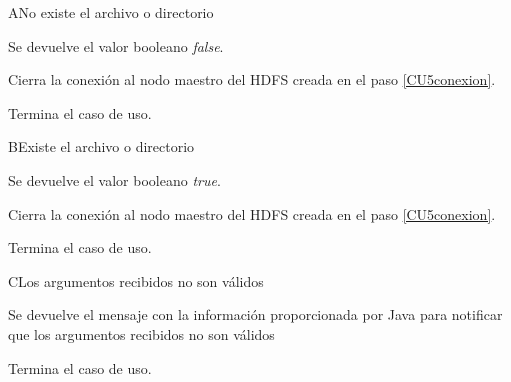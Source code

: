 
\begin{UCtrayectoriaA}{A}{No existe el archivo o directorio}

	\UCpaso[\UCsist]  Se devuelve el valor booleano \emph{false}.

	\UCpaso[\UCsist] Cierra la conexión al nodo maestro del HDFS creada en el paso \ref{CU5conexion}.

	\UCpaso[] Termina el caso de uso.

\end{UCtrayectoriaA}



\begin{UCtrayectoriaA}{B}{Existe el archivo o directorio}

	\UCpaso Se devuelve el valor booleano \emph{true}.

	\UCpaso[\UCsist] Cierra la conexión al nodo maestro del HDFS creada en el paso \ref{CU5conexion}.

	\UCpaso[] Termina el caso de uso.

\end{UCtrayectoriaA}

\begin{UCtrayectoriaA}{C}{Los argumentos recibidos no son válidos}

	\UCpaso Se devuelve el mensaje con la información proporcionada por Java para notificar que los argumentos recibidos no son válidos
	
	\UCpaso[] Termina el caso de uso.

\end{UCtrayectoriaA}


